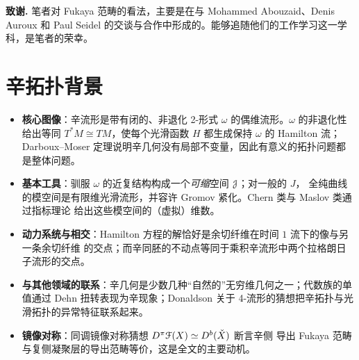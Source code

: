 \documentclass[11pt,a4paper]{article}
\numberwithin{equation}{section}
\newcommand{\scrF}{\EuScript{F}}
\newcommand{\scrJ}{\EuScript{J}}
\newcommand{\Cech}[1]{\check{#1}}
\begin{document}
\vspace{0.2cm}
\noindent\textbf{致谢.} 笔者对 Fukaya 范畴的看法，主要是在与 Mohammed Abouzaid、Denis Auroux
和 Paul Seidel 的交谈与合作中形成的。能够追随他们的工作学习这一学科，是笔者的荣幸。





\section{辛拓扑背景}\label{Sec:Symplectic}

\begin{keypoints}
\begin{itemize}
  \item \textbf{核心图像}：辛流形是带有闭的、非退化 2-形式 $\omega$ 的偶维流形。$\omega$ 的非退化性
        给出等同 $T^*M \cong TM$，使每个光滑函数 $H$ 都生成保持 $\omega$ 的 Hamilton 流；
        Darboux--Moser 定理说明辛几何没有局部不变量，因此有意义的拓扑问题都是整体问题。
  \item \textbf{基本工具}：驯服 $\omega$ 的近复结构构成一个\emph{可缩}空间 $\scrJ$；对一般的 $J$，
        全纯曲线的模空间是有限维光滑流形，并容许 Gromov 紧化。Chern 类与 Maslov 类通过指标理论
        给出这些模空间的（虚拟）维数。
  \item \textbf{动力系统与相交}：Hamilton 方程的解恰好是余切纤维在时间 $1$ 流下的像与另一条余切纤维
        的交点；而辛同胚的不动点等同于乘积辛流形中两个拉格朗日子流形的交点。
  \item \textbf{与其他领域的联系}：辛几何是少数几种“自然的”无穷维几何之一；代数族的单值通过
        Dehn 扭转表现为辛现象；Donaldson 关于 4-流形的猜想把辛拓扑与光滑拓扑的异常特征联系起来。
  \item \textbf{镜像对称}：同调镜像对称猜想 $D^{\pi}\scrF(X) \simeq D^b(\Cech{X})$ 断言辛侧
        导出 Fukaya 范畴与复侧凝聚层的导出范畴等价，这是全文的主要动机。
\end{itemize}
\end{keypoints}
\end{document}
